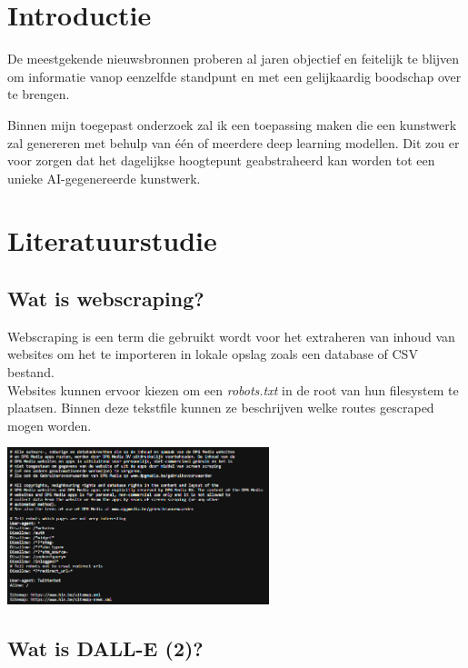 
\section{Introductie}%
\label{sec:introductie}
\noindent
De meestgekende nieuwsbronnen proberen al jaren objectief en feitelijk te blijven om informatie vanop eenzelfde standpunt en met een gelijkaardig boodschap over te brengen. 

\noindent
Binnen mijn toegepast onderzoek zal ik een toepassing maken die een kunstwerk zal genereren met behulp van één of meerdere deep learning modellen. Dit zou er voor zorgen dat het dagelijkse hoogtepunt geabstraheerd kan worden tot een unieke AI-gegenereerde kunstwerk.


\section{Literatuurstudie}%
\subsection{Wat is webscraping?} 
\noindent
Webscraping is een term die gebruikt wordt voor het extraheren van inhoud van websites om het te importeren in lokale opslag zoals een database of CSV bestand.  \autocite{Salem2020} \\
\noindent
Websites kunnen ervoor kiezen om een \emph{robots.txt} in de root van hun filesystem te plaatsen. Binnen deze tekstfile kunnen ze beschrijven welke routes gescraped mogen worden. \autocite{GoogleDocs} \\
\begin{center}
    \includegraphics[width = 3in]{robotstxt_hln}
\end{center}

\subsection{Wat is DALL-E (2)?}


